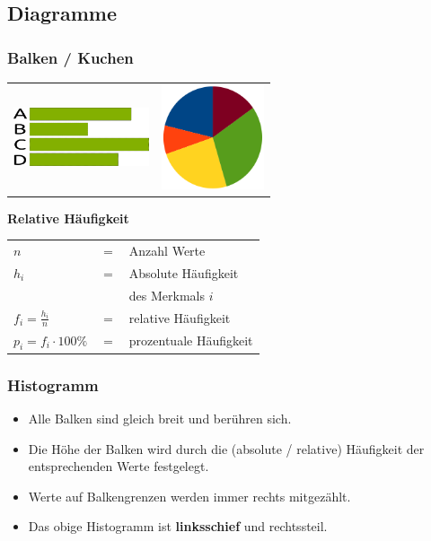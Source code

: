 \begin{multicols}{2}
\subsection*{Diagramme}
\subsubsection*{Balken / Kuchen}
\begin{tabular}{cc}
 \includegraphics[width=4cm]{img/balkendiagramm.png} &  \includegraphics[width=3cm]{img/kuchendiagramm.png}\\
  \end{tabular}
\begin{tcolorbox}[colback=white]
  \textbf{Relative Häufigkeit}\\
\begin{tabular}{lcl}
$n$   &$=$& Anzahl Werte\\
$h_i$ &$=$& Absolute Häufigkeit\\
      & & des Merkmals $i$\\
$f_i = \frac{h_i}n$ &$=$& relative Häufigkeit\\
$p_i = f_i\cdot{}100\%$ &$=$& prozentuale Häufigkeit%
  \end{tabular}
\end{tcolorbox}



\subsubsection*{Histogramm}

\begin{itemize}
\item Alle Balken sind gleich breit und berühren sich.
\item Die Höhe der Balken wird durch die (absolute / relative) Häufigkeit der entsprechenden
Werte festgelegt.
\item Werte auf Balkengrenzen werden immer rechts mitgezählt.
\item Das obige Histogramm ist \textbf{linksschief} und rechtssteil.
\end{itemize}



\end{multicols}
